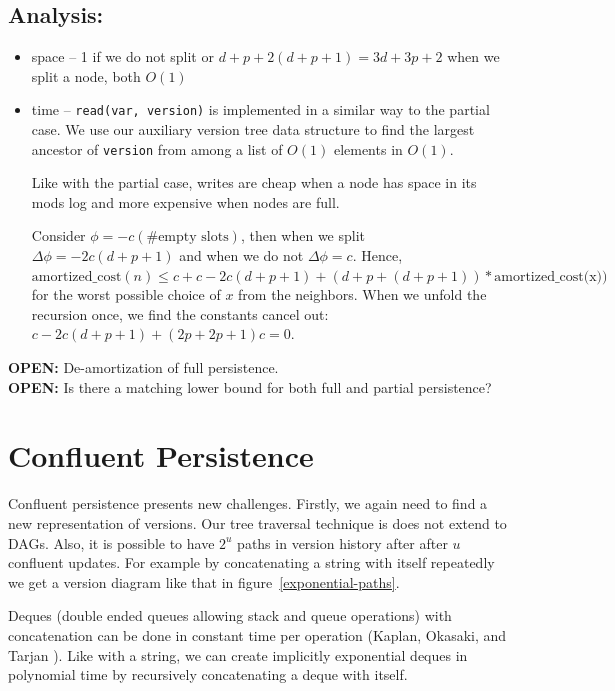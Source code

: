 \documentclass[11pt]{article}
\begin{document}
\subsection{Analysis:}
\begin{itemize}
\item space -- 1 if we do not split or \(d + p + 2(d  + p + 1) = 3d + 3p + 2\) when we split a node, both \( O(1) \)
\item time -- \verb!read(var, version)! is implemented in a similar way to the partial case. We use our auxiliary version tree data structure to find the largest ancestor of \verb!version! from among a list of \(O(1)\) elements in \(O(1)\). 

Like with the partial case, writes are cheap when a node has space in its mods log and  more expensive when nodes are full. 

Consider \( \phi =  -c(\mbox{\# empty slots}) \), then  when we split  \( \Delta \phi = -2c(d + p + 1) \) and when we do not \(\Delta \phi = c\). Hence, \(\mbox{amortized\_cost}(n) \leq c + c - 2c(d + p + 1) + (d + p + (d + p + 1))*\mbox{amortized\_cost(x)})\) for the worst possible choice of $x$ from the neighbors.  When we unfold the recursion once,  we find the constants cancel out: \( c - 2c(d+p+1) + (2p + 2p + 1)c = 0\).
\end{itemize}

{\bf OPEN:} De-amortization of full persistence.\\
{\bf OPEN:} Is there a matching lower bound for both full and partial persistence?\\

\section{Confluent Persistence}
Confluent persistence presents new challenges. Firstly, we again need to find a new representation of versions. Our tree traversal technique is does not extend to DAGs.  Also, it is possible to have $2^u$ paths in version history after after $u$ confluent updates. For example by concatenating a string with itself repeatedly we get a version diagram like that in figure~\ref{exponential-paths}.

Deques (double ended queues allowing stack and queue operations) with concatenation can be done in constant time per operation (Kaplan, Okasaki, and Tarjan \cite{kot}). Like with a string, we can create implicitly exponential deques in polynomial time by recursively concatenating a deque with itself. 
\end{document}
